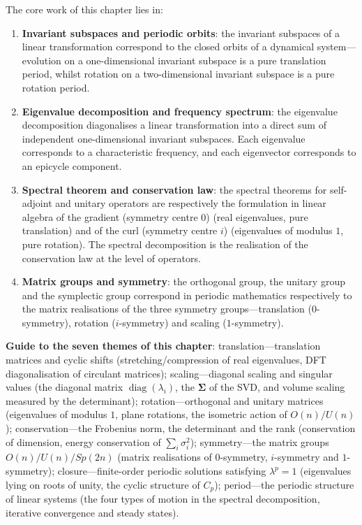 \begin{remark}
The core work of this chapter lies in:
\begin{enumerate}[label=(\arabic*)]
    \item \textbf{Invariant subspaces and periodic orbits}: the invariant subspaces of a linear transformation correspond to the closed orbits of a dynamical system---evolution on a one-dimensional invariant subspace is a pure translation period, whilst rotation on a two-dimensional invariant subspace is a pure rotation period.
    \item \textbf{Eigenvalue decomposition and frequency spectrum}: the eigenvalue decomposition diagonalises a linear transformation into a direct sum of independent one-dimensional invariant subspaces. Each eigenvalue corresponds to a characteristic frequency, and each eigenvector corresponds to an epicycle component.
    \item \textbf{Spectral theorem and conservation law}: the spectral theorems for self-adjoint and unitary operators are respectively the formulation in linear algebra of the gradient (symmetry centre $0$) (real eigenvalues, pure translation) and of the curl (symmetry centre $i$) (eigenvalues of modulus $1$, pure rotation). The spectral decomposition is the realisation of the conservation law at the level of operators.
    \item \textbf{Matrix groups and symmetry}: the orthogonal group, the unitary group and the symplectic group correspond in periodic mathematics respectively to the matrix realisations of the three symmetry groups---translation ($0$-symmetry), rotation ($i$-symmetry) and scaling ($1$-symmetry).
\end{enumerate}

\textbf{Guide to the seven themes of this chapter}: translation---translation matrices and cyclic shifts (stretching/compression of real eigenvalues, DFT diagonalisation of circulant matrices); scaling---diagonal scaling and singular values (the diagonal matrix $\operatorname{diag}(\lambda_i)$, the $\boldsymbol{\Sigma}$ of the SVD, and volume scaling measured by the determinant); rotation---orthogonal and unitary matrices (eigenvalues of modulus $1$, plane rotations, the isometric action of $O(n)/U(n)$); conservation---the Frobenius norm, the determinant and the rank (conservation of dimension, energy conservation of $\sum_i \sigma_i^2$); symmetry---the matrix groups $O(n)/U(n)/Sp(2n)$ (matrix realisations of $0$-symmetry, $i$-symmetry and $1$-symmetry); closure---finite-order periodic solutions satisfying $\lambda^p = 1$ (eigenvalues lying on roots of unity, the cyclic structure of $C_p$); period---the periodic structure of linear systems (the four types of motion in the spectral decomposition, iterative convergence and steady states).
\end{remark}

